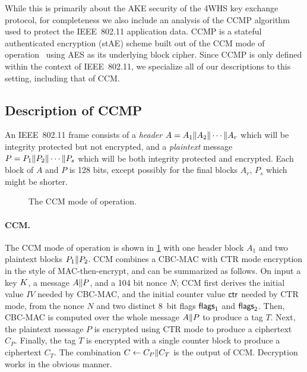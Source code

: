 While this  is primarily about the AKE security of the 4WHS key exchange protocol,
for completeness we also include an analysis of the CCMP algorithm used to protect the IEEE~802.11 application data.
CCMP is a stateful authenticated encryption (stAE) scheme built out of the CCM mode of operation~\cite{IETF:RFC3610:CCM} using AES as its underlying block cipher.
Since CCMP is only defined within the context of IEEE~802.11,
we specialize all of our descriptions to this setting,
including that of CCM.





\subsection{Description of CCMP}



An IEEE~802.11 frame consists of a \emph{header} $A = A_1 \| A_2 \| \dotsb \| A_r$ which will be integrity protected but not encrypted,
and a \emph{plaintext} message $P = P_1 \| P_2 \| \dotsb \| P_s$ which will be both integrity protected and encrypted.
Each block of $A$ and $P$ is 128 bits,
except possibly for the final blocks $A_r$, $P_s$ which might be shorter.

\begin{figure}
	\centerline{
		\hspace{-0.7em}
	}
	
	\caption{The CCM mode of operation.}
	\label{fig:CCM}
\end{figure}



\paragraph{CCM.}
The CCM mode of operation is shown in \cref{fig:CCM} with one header block $A_1$ and two plaintext blocks $P_1 \| P_2$.
CCM combines a CBC-MAC with CTR mode encryption in the style of MAC-then-encrypt,
and can be summarized as follows.
On input a key $K$,
a message $A \| P$,
and a 104 bit nonce $N$;
CCM first derives the initial value $IV$ needed by CBC-MAC, and the initial counter value $\mathsf{ctr}$ needed by CTR mode,
from the nonce $N$ and two distinct 8~bit flags $\mathsf{flags}_1$ and $\mathsf{flags}_2$.
Then, CBC-MAC is computed over the whole message $A \| P$ to produce a tag $T$.
Next, the plaintext message $P$ is encrypted using CTR mode to produce a ciphertext $C_P$.
Finally,
the tag $T$ is encrypted with a single counter block to produce a ciphertext $C_T$.
The combination $C \gets C_P \| C_T$ is the output of CCM.
Decryption works in the obvious manner.


